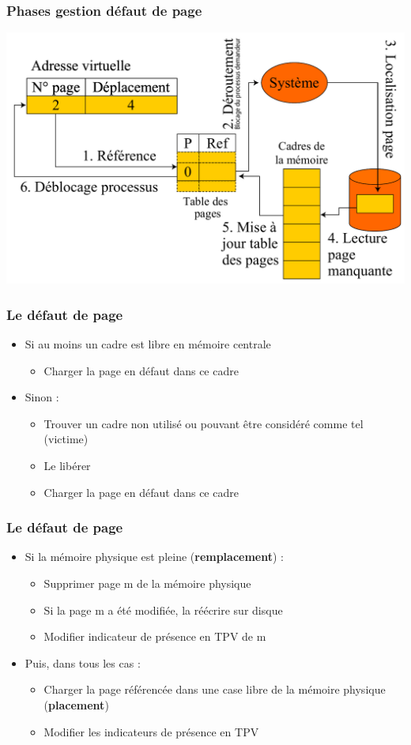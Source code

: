 \begin{frame}
\frametitle{Phases gestion défaut de page}
\includegraphics[width=\textwidth]{../illustration/traitement_defaut_page.pdf}
\end{frame}


\begin{frame}
\frametitle{Le défaut de page}
\begin{itemize}
\item Si au moins un cadre est libre en mémoire centrale
\begin{itemize}
\item Charger la page en défaut dans ce cadre
\end{itemize}
\item Sinon :
\begin{itemize}
\item Trouver un cadre non utilisé ou pouvant être considéré comme tel (victime)
\item Le libérer
\item Charger la page en défaut dans ce cadre
\end{itemize}
\end{itemize}

\end{frame}


\begin{frame}
\frametitle{Le défaut de page}
\begin{itemize}
\item Si la mémoire physique est pleine (\textbf{remplacement}) :
\begin{itemize}
\item Supprimer page m de la mémoire physique
\item Si la page m a été modifiée, la réécrire sur disque  
\item Modifier indicateur de présence en TPV de m
\end{itemize}
\item Puis, dans tous les cas :
\begin{itemize}
\item Charger la page référencée dans une case libre de la mémoire physique (\textbf{placement})
\item Modifier les indicateurs de présence en TPV
\end{itemize}
\end{itemize}
\end{frame}


